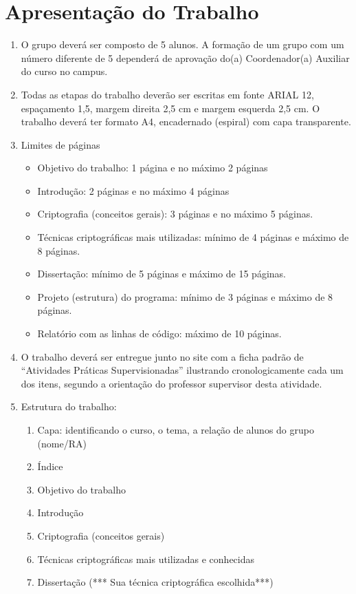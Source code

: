 \documentclass[12pt]{article}
\begin{document}
\section{Apresentação do Trabalho}

\renewcommand{\labelenumi}{\arabic{enumi}.}
\renewcommand{\labelenumii}{\arabic{enumi}.\arabic{enumii}.}
\renewcommand{\labelenumiii}{\arabic{enumi}.\arabic{enumii}.\arabic{enumiii}.}
\begin{enumerate}
\item O grupo deverá ser composto de 5 alunos. A formação de um grupo com um
número diferente de 5 dependerá de aprovação do(a) Coordenador(a) Auxiliar do
curso no campus.
\item Todas as etapas do trabalho deverão ser escritas em fonte ARIAL 12,
espaçamento 1,5, margem direita 2,5 cm e margem esquerda 2,5 cm. O trabalho
deverá ter formato A4, encadernado (espiral) com capa transparente.
\item Limites de páginas
\begin{itemize}
\item Objetivo do trabalho: 1 página e no máximo 2 páginas
\item Introdução: 2 páginas e no máximo 4 páginas
\item Criptografia (conceitos gerais): 3 páginas e no máximo 5 páginas.
\item Técnicas criptográficas mais utilizadas: mínimo de 4 páginas e máximo de 8
páginas.
\item Dissertação: mínimo de 5 páginas e máximo de 15 páginas.
\item Projeto (estrutura) do programa: mínimo de 3 páginas e máximo de 8 páginas.
\item Relatório com as linhas de código: máximo de 10 páginas.
\end{itemize}
\item O trabalho deverá ser entregue junto no site com a ficha padrão de “Atividades Práticas
Supervisionadas” ilustrando cronologicamente cada um dos itens, segundo a
orientação do professor supervisor desta atividade.
\item Estrutura do trabalho:

\begin{enumerate}

\item Capa: identificando o curso, o tema, a relação de alunos do grupo (nome/RA)
\item Índice
\item Objetivo do trabalho
\item Introdução
\item Criptografia (conceitos gerais)
\item Técnicas criptográficas mais utilizadas e conhecidas
\item Dissertação (*** Sua técnica criptográfica escolhida***)
\begin{enumerate}


\end{enumerate}
\end{enumerate}
\end{enumerate}
\end{document}
